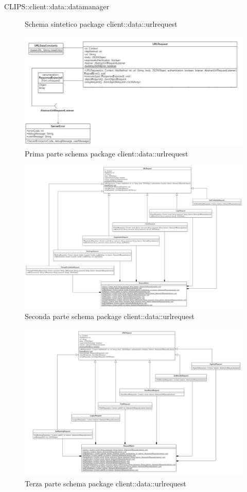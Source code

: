 \begin{componente}{CLIPS::client::data::datamanager}
\begin{compClassi}
\begin{figure}[h!]
	\caption{Schema sintetico package client::data::urlrequest}
\end{figure}
\begin{figure}[h!]
	\centering
	\includegraphics[scale=0.5]{img/package/png/client--urlrequest1.png}
	\caption{Prima parte schema package client::data::urlrequest}
\end{figure}
\begin{figure}[h!]
	\centering
	\includegraphics[scale=0.30]{img/package/png/client--urlrequest2.png}
	\caption{Seconda parte schema package client::data::urlrequest}
\end{figure}
\begin{figure}[h!]
	\centering
	\includegraphics[scale=0.35]{img/package/png/client--urlrequest3.png}
	\caption{Terza parte schema package client::data::urlrequest}
\end{figure}


\end{compClassi}
\end{componente}
